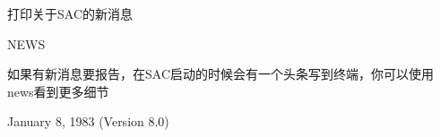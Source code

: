 \label{cmd:news}

打印关于SAC的新消息

NEWS

如果有新消息要报告，在SAC启动的时候会有一个头条写到终端，你可以使用news看到更多细节

January 8, 1983 (Version 8.0)
